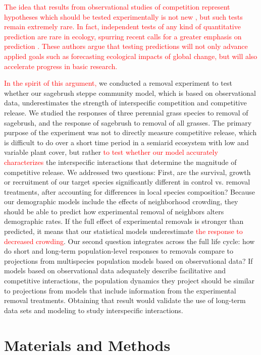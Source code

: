 \documentclass[11pt]{article}
\newcommand{\new}{\textcolor{red}}
\begin{document}
\begin{doublespacing}
\new{The idea that results from observational studies of competition represent hypotheses which should be tested experimentally is not new \citep{Hairston1980}, but such tests remain extremely rare. In fact, independent tests of any kind of quantitative prediction are rare in ecology, spurring recent calls for a greater emphasis on prediction \citep{Mouquet2015,Petchey2015,Houlahan2017}. These authors argue that testing predictions will not only advance applied goals such as forecasting ecological impacts of global change, but will also accelerate progress in basic research.}

\new{In the spirit of this argument,} we conducted a removal experiment to test whether our sagebrush steppe community model, which is based on observational data, underestimates the strength of interspecific competition and competitive release. We studied the responses of three perennial grass species to removal of sagebrush, and the response of sagebrush to removal of all grasses. The primary purpose of the experiment was not to directly measure competitive release, which is difficult to do over a short time period in a semiarid ecosystem with low and variable plant cover, but rather \new{to test whether our model accurately characterizes} the interspecific interactions that determine the magnitude of competitive release. We addressed two questions: First, are the survival, growth or recruitment of our target species significantly different in control vs. removal treatments, after accounting for differences in local species composition? Because our demographic models include the effects of neighborhood crowding, they should be able to predict how experimental removal of neighbors alters demographic rates. If the full effect of experimental removals is stronger than predicted, it means that our statistical models underestimate \new{the response to decreased crowding}. Our second question integrates across the full life cycle: how do short and long-term population-level responses to removals compare to projections from multispecies population models based on observational data? If models based on observational data adequately describe facilitative and competitive interactions, the population dynamics they project should be similar to projections from models that include information from the experimental removal treatments. 
Obtaining that result would validate the use of long-term data sets and modeling to study interspecific interactions. 

\section*{Materials and Methods}


\end{doublespacing}
\end{document}
